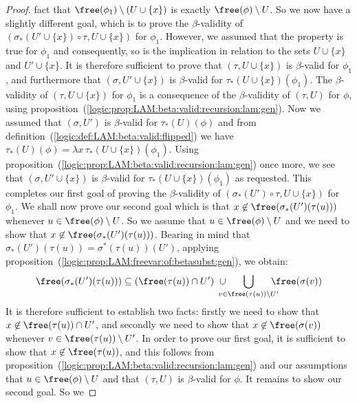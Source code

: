 \begin{proof}
    fact that $\free(\phi_{1})\setminus(U\cup\{x\})$ is exactly $\free(\phi)
    \setminus U$. So we now have a slightly different goal, which is to
    prove the $\beta$-validity of $(\sigma_{*}(U'\cup\{x\})\circ\tau,U\cup\{x\})$
    for $\phi_{1}$. However, we assumed that the property is true for $\phi_{1}$
    and consequently, so is the implication in relation to the sets
    $U\cup\{x\}$ and $U'\cup\{x\}$. It is therefore sufficient to prove that
    $(\tau,U\cup\{x\})$ is $\beta$-valid for $\phi_{1}$, and furthermore
    that $(\sigma,U'\cup\{x\})$ is $\beta$-valid for $\tau_{*}(U\cup\{x\})
    (\phi_{1})$. The $\beta$-validity of $(\tau,U\cup\{x\})$ for $\phi_{1}$
    is a consequence of the $\beta$-validity of $(\tau,U)$ for $\phi$, using 
    proposition~(\ref{logic:prop:LAM:beta:valid:recursion:lam:gen}). Now
    we assumed that $(\sigma,U')$ is $\beta$-valid for $\tau_{*}(U)(\phi)$ and
    from definition~(\ref{logic:def:LAM:beta:valid:flipped}) we have
    $\tau_{*}(U)(\phi)=\lambda x\,\tau_{*}(U\cup\{x\})(\phi_{1})$. Using
    proposition~(\ref{logic:prop:LAM:beta:valid:recursion:lam:gen}) once
    more, we see that $(\sigma, U'\cup\{x\})$ is $\beta$-valid for
    $\tau_{*}(U\cup\{x\})(\phi_{1})$ as requested. This completes our
    first goal of proving the $\beta$-validity of $(\sigma_{*}(U')\circ\tau,
    U\cup\{x\})$ for $\phi_{1}$. We shall now prove our second goal which
    is that $x\not\in\free(\sigma_{*}(U')(\tau(u)))$ whenever 
    $u\in\free(\phi)\setminus U$. So we assume that $u\in\free(\phi)\setminus 
    U$ and we need to show that $x\not\in\free(\sigma_{*}(U')(\tau(u)))$.
    Bearing in mind that $\sigma_{*}(U')(\tau(u))=\sigma^{*}(\tau(u))(U')$,
    applying proposition~(\ref{logic:prop:LAM:freevar:of:betasubst:gen}), 
    we obtain:
        \[
            \free(\sigma_{*}(U')(\tau(u))) 
                \subseteq 
            (\free(\tau(u))\cap U')
            \ \cup\ 
            \!\!\!\!\!\!\!\!
            \bigcup_{v\in\free(\tau(u))\setminus U'}
            \!\!\!\!\!\!
            \free(\sigma(v))
        \]
    It is therefore sufficient to establish two facts: firstly we need to show 
    that $x\not\in\free(\tau(u))\cap U'$, and secondly we need to show that 
    $x\not\in\free(\sigma(v))$ whenever $v\in\free(\tau(u))\setminus U'$.
    In order to prove our first goal, it is sufficient to show that $x\not
    \in\free(\tau(u))$, and this follows from
    proposition~(\ref{logic:prop:LAM:beta:valid:recursion:lam:gen}) and our
    assumptions that $u\in\free(\phi)\setminus U$ and that $(\tau,U)$ is
    $\beta$-valid for $\phi$. It remains to show our second goal. So we

\end{proof}
